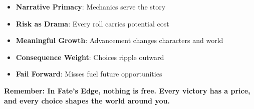 \documentclass[11pt]{article}
\begin{document}
\begin{fatebox}
\begin{itemize}
    \item \textbf{Narrative Primacy}: Mechanics serve the story
    \item \textbf{Risk as Drama}: Every roll carries potential cost
    \item \textbf{Meaningful Growth}: Advancement changes characters and world
    \item \textbf{Consequence Weight}: Choices ripple outward
    \item \textbf{Fail Forward}: Misses fuel future opportunities
\end{itemize}
\end{fatebox}

\begin{center}
\textbf{Remember: In Fate's Edge, nothing is free. Every victory has a price,}\\
\textbf{and every choice shapes the world around you.}
\end{center}
\end{document}
